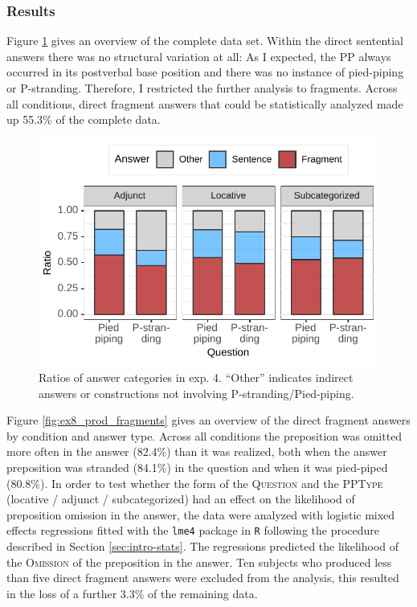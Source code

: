 \subsubsection{Results}
Figure \ref{fig:ex8_prod_relfrag} gives an overview of the complete data set. Within the direct sentential answers there was no structural variation at all: As I expected, the PP always occurred in its postverbal base position and there was no instance of pied-piping or P-stranding. Therefore, I restricted the further analysis to fragments. Across all conditions, direct fragment answers that could be statistically analyzed made up 55.3\% of the complete data.

\begin{figure}[t]
\includegraphics[scale=1]{figures/ex8_prod_answers}
 \caption{Ratios of answer categories in exp. 4. ``Other'' indicates indirect answers or constructions not involving P-stranding/Pied-piping\label{fig:ex8_prod_relfrag}.}
\end{figure}

Figure \ref{fig:ex8_prod_fragments} gives an overview of the direct fragment answers by condition and answer type. Across all conditions the preposition was omitted more often in the answer (82.4\%) than it was realized, both when the answer preposition was stranded (84.1\%) in the question and when it was pied-piped (80.8\%). In order to test whether the form of the \textsc{Question} and the \textsc{PPType} (locative / adjunct / subcategorized) had an effect on the likelihood of preposition omission in the answer, the data were analyzed with logistic mixed effects regressions fitted with the \texttt{lme4} \citep{bates.etal2015} package in \texttt{R} following the procedure described in Section \ref{sec:intro-stats}. The regressions predicted the likelihood of the \textsc{Omission} of the preposition in the answer. Ten subjects who produced less than five direct fragment answers were excluded from the analysis, this resulted in the loss of a further 3.3\% of the remaining data.

